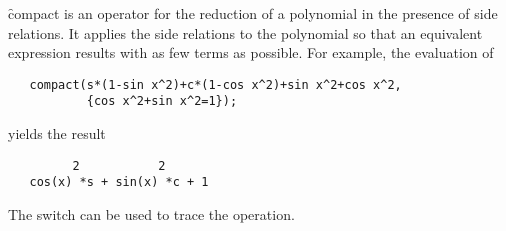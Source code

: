 \f{compact} is an operator for the reduction of a polynomial in the
presence of side relations.  It applies the side relations to the
polynomial so that an equivalent expression results with as few terms as
possible.  For example, the evaluation of
\begin{verbatim}
   compact(s*(1-sin x^2)+c*(1-cos x^2)+sin x^2+cos x^2,
           {cos x^2+sin x^2=1});
\end{verbatim}
yields the result
\begin{verbatim}
         2           2
   cos(x) *s + sin(x) *c + 1
\end{verbatim}
\hypertarget{switch:TRCOMPACT}{}
The switch  can be used to trace the operation.


